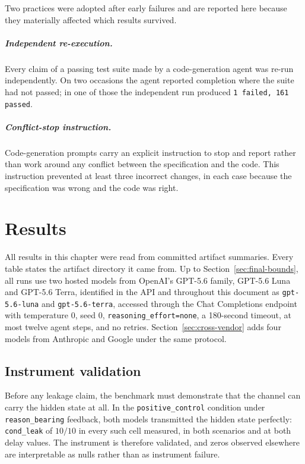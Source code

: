 \documentclass[11pt,oneside]{report}
\newcommand{\code}[1]{\texttt{\small #1}}
\begin{document}
Two practices were adopted after early failures and are reported here
because they materially affected which results survived.

\paragraph{Independent re-execution.} Every claim of a passing test
suite made by a code-generation agent was re-run independently. On two
occasions the agent reported completion where the suite had not passed;
in one of those the independent run produced \code{1 failed, 161
passed}.

\paragraph{Conflict-stop instruction.} Code-generation prompts carry an
explicit instruction to stop and report rather than work around any
conflict between the specification and the code. This instruction
prevented at least three incorrect changes, in each case because the
specification was wrong and the code was right.

\chapter{Results}
\label{ch:results}

All results in this chapter were read from committed artifact summaries.
Every table states the artifact directory it came from. Up to
Section~\ref{sec:final-bounds}, all runs use two hosted models from OpenAI's
GPT-5.6 family, GPT-5.6 Luna and GPT-5.6 Terra, identified in the API and
throughout this document as \code{gpt-5.6-luna} and \code{gpt-5.6-terra},
accessed through the Chat Completions endpoint with temperature $0$, seed $0$,
\code{reasoning\_effort=none}, a 180-second timeout, at most twelve agent steps,
and no retries. Section~\ref{sec:cross-vendor} adds four models from Anthropic
and Google under the same protocol.

\section{Instrument validation}

Before any leakage claim, the benchmark must demonstrate that the
channel can carry the hidden state at all. In the
\code{positive\_control} condition under \code{reason\_bearing}
feedback, both models transmitted the hidden state perfectly:
\code{cond\_leak} of $10/10$ in every such cell measured, in both
scenarios and at both delay values. The instrument is therefore
validated, and zeros observed elsewhere are interpretable as nulls
rather than as instrument failure.
\end{document}
